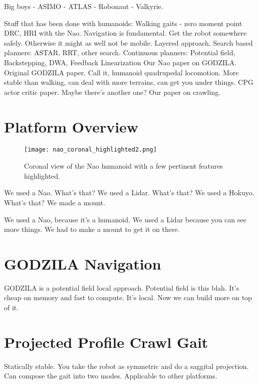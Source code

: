 Big boys
- ASIMO
- ATLAS
- Robonaut
- Valkyrie.

 Stuff that has been done with humanoids:
Walking gaits
 - zero moment point
DRC, HRI with the Nao.
Navigation is fundamental. Get the robot somewhere safely. Otherwise it might
as well not be mobile.
Layered approach.
Search based planners: ASTAR, RRT, other search.
Continuous planners: Potential field, Backstepping, DWA, Feedback Linearization
Our Nao paper on GODZILA\@.
Original GODZILA paper.
Call it, humanoid quadrupedal locomotion.
More stable than walking, can deal with more terrains, can get you under things.
CPG actor critic paper. Maybe there's another one?
Our paper on crawling.

\section{Platform Overview}

\begin{figure}
	\centering
	\texttt{[image: nao\_coronal\_highlighted2.png]}
    \caption{Coronal view of the Nao humanoid with a few pertinent features 
             highlighted.}
	\label{fig:nao_diagram1}
\end{figure}

We used a Nao. What's that?
We used a Lidar. What's that? We used a Hokuyo. What's that?
We made a mount.

We used a Nao, because it's a humanoid.
We used a Lidar because you can see more things.
We had to make a mount to get it on there.


\section{GODZILA Navigation}
GODZILA is a potential field local approach.
Potential field is this blah.
It's cheap on memory and fast to compute.
It's local. Now we can build more on top of it.

\section{Projected Profile Crawl Gait}
Statically stable.
You take the robot as symmetric and do a saggital projection.
Can compose the gait into two modes.
Applicable to other platforms.


